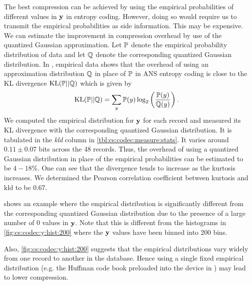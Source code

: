 The best compression can be achieved by using the empirical
probabilities of different values in $\mathbf{y}$ in entropy coding.
However, doing so would require us to transmit the empirical
probabilities as side information. This may be expensive.
We can estimate the improvement in compression overhead
by use of the quantized Gaussian approximation.
Let $\mathbb{P}$ denote the empirical probability distribution
of data and let $\mathbb{Q}$ denote the corresponding
quantized Gaussian distribution. In \cite{bamler2022constriction},
empirical data shows that the overhead of using an approximation
distribution $\mathbb{Q}$ in place of $\mathbb{P}$ in ANS entropy coding
is close to the KL divergence $\text{KL}(\mathbb{P} || \mathbb{Q})$
which is given by
\begin{equation}
\text{KL}(\mathbb{P} || \mathbb{Q}) = \sum_y \mathbb{P}(y) \log_2\left (\frac{\mathbb{P}(y)}{\mathbb{Q}(y)} \right).
\end{equation}
We computed the empirical distribution for $\mathbf{y}$ for each
record and measured its KL divergence with the corresponding
quantized Gaussian distribution.
It is tabulated in the \emph{kld} column in \cref{tbl:cs:codec:measure:stats}.
It varies around $0.11 \pm 0.07$ bits
across the 48 records.
Thus, the overhead of using a quantized
Gaussian distribution in place of the empirical probabilities
can be estimated to be $4-18\%$.
One can see that the divergence tends to increase as the
kurtosis increases. We determined the Pearson correlation
coefficient between kurtosis and kld to be $0.67$.

 shows an example
where the empirical distribution is significantly different
from the corresponding quantized Gaussian distribution
due to the presence of a large
number of $0$ values in $\mathbf{y}$. Note that this is different
from the histograms in \cref{fig:cs:codec:y:hist:200} where
the $\mathbf{y}$ values have been binned into 200 bins.

Also, \cref{fig:cs:codec:y:hist:200} suggests that the empirical
distributions vary widely from one record to another in the
database. Hence using a single fixed empirical distribution
(e.g. the Huffman code book preloaded into the device in
\cite{mamaghanian2011compressed})
may lead to lower compression.



